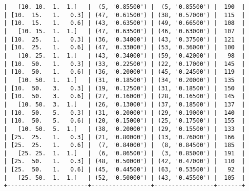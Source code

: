 \documentclass{article}
\begin{document}
\begin{verbatim}
|   [10. 10.  1.  1.]   |  (5, '0.85500') |  (5, '0.85500') |  190  |
| [10.  15.   1.   0.3] | (47, '0.61500') | (38, '0.57000') |  115  |
| [10.  15.   1.   0.6] | (43, '0.63500') | (49, '0.66500') |  108  |
|   [10. 15.  1.  1.]   | (47, '0.63500') | (46, '0.63000') |  107  |
| [10.  25.   1.   0.3] | (36, '0.34000') | (43, '0.37500') |  121  |
| [10.  25.   1.   0.6] | (47, '0.33000') | (53, '0.36000') |  100  |
|   [10. 25.  1.  1.]   | (43, '0.34000') | (59, '0.42000') |   98  |
| [10.  50.   1.   0.3] | (33, '0.22500') | (22, '0.17000') |  145  |
| [10.  50.   1.   0.6] | (36, '0.20000') | (45, '0.24500') |  119  |
|   [10. 50.  1.  1.]   | (31, '0.18500') | (34, '0.20000') |  135  |
| [10.  50.   3.   0.3] | (19, '0.12500') | (31, '0.18500') |  150  |
| [10.  50.   3.   0.6] | (27, '0.16000') | (28, '0.16500') |  145  |
|   [10. 50.  3.  1.]   | (26, '0.13000') | (37, '0.18500') |  137  |
| [10.  50.   5.   0.3] | (31, '0.20000') | (29, '0.19000') |  140  |
| [10.  50.   5.   0.6] | (20, '0.15000') | (25, '0.17500') |  155  |
|   [10. 50.  5.  1.]   | (38, '0.20000') | (29, '0.15500') |  133  |
| [25.  25.   1.   0.3] | (21, '0.80000') | (13, '0.76000') |  166  |
| [25.  25.   1.   0.6] |  (7, '0.84000') |  (8, '0.84500') |  185  |
|   [25. 25.  1.  1.]   |  (6, '0.86500') |  (3, '0.85000') |  191  |
| [25.  50.   1.   0.3] | (48, '0.50000') | (42, '0.47000') |  110  |
| [25.  50.   1.   0.6] | (45, '0.44500') | (63, '0.53500') |   92  |
|   [25. 50.  1.  1.]   | (52, '0.50000') | (43, '0.45500') |  105  |
+-----------------------+-----------------+-----------------+-------+
\end{verbatim}
\end{document}
